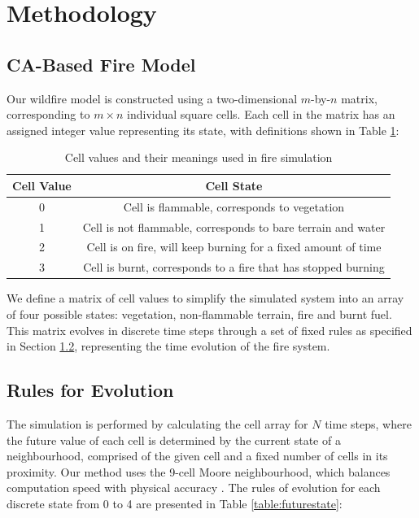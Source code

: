 \newpage
\section{Methodology}\label{methodology}

\subsection{CA-Based Fire Model}

Our wildfire model is constructed using a two-dimensional $m$-by-$n$ matrix, corresponding to $m\times n$ individual square cells. Each cell in the matrix has an assigned integer value representing its state, with definitions shown in Table \ref{table:cellstates}:

\begin{table}[h!]
    \centering
    \begin{tabular}{|c|c|}
    \hline
     \textbf{Cell Value} & \textbf{Cell State} \\ \hline
     0 & Cell is flammable, corresponds to vegetation\\ \hline
     1 & Cell is not flammable, corresponds to bare terrain and water\\ \hline
     2 & Cell is on fire, will keep burning for a fixed amount of time\\ \hline
     3 & Cell is burnt, corresponds to a fire that has stopped burning\\ \hline
    \end{tabular}
    \caption{Cell values and their meanings used in fire simulation}
    \label{table:cellstates}
\end{table}

\noindent We define a matrix of cell values to simplify the simulated system into an array of four possible states: vegetation, non-flammable terrain, fire and burnt fuel. This matrix evolves in discrete time steps through a set of fixed rules as specified in Section \ref{ruleset}, representing the time evolution of the fire system.

\subsection{Rules for Evolution}\label{ruleset}

The simulation is performed by calculating the cell array for $N$ time steps, where the future value of each cell is determined by the current state of a neighbourhood, comprised of the given cell and a fixed number of cells in its proximity. Our method uses the 9-cell Moore neighbourhood, which balances computation speed with physical accuracy \cite{Wolfram_2002}. The rules of evolution for each discrete state from 0 to 4 are presented in Table \ref{table:futurestate}:

